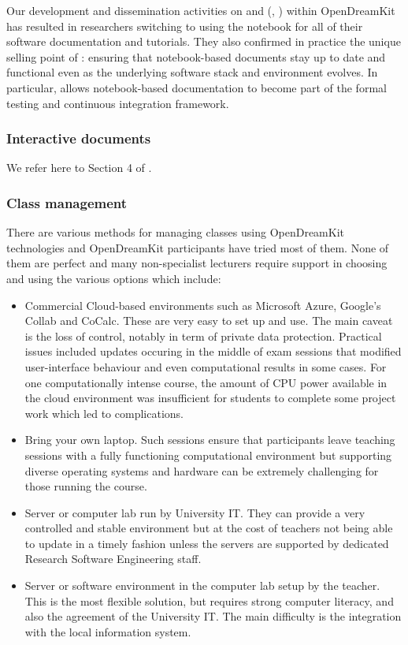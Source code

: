 \documentclass{deliverablereport}
\begin{document}
Our development and dissemination activities on \nbval and \nbdime
(, ) within
OpenDreamKit has resulted in researchers switching to using the
notebook for all of their software documentation and tutorials. They
also confirmed in practice the unique selling point of \nbval:
ensuring that notebook-based documents stay up to date and functional
even as the underlying software stack and environment evolves. In
particular, \nbval allows notebook-based documentation to become part
of the formal testing and continuous integration framework.

\subsubsection{Interactive documents}

We refer here to Section 4 of .

\subsubsection{Class management}

There are various methods for managing classes using OpenDreamKit
technologies and OpenDreamKit participants have tried most of them. None
of them are perfect and many non-specialist lecturers require support in
choosing and using the various options which include:

\begin{itemize}
\tightlist
\item Commercial Cloud-based environments such as Microsoft Azure,
  Google's Collab and CoCalc. These are very easy to set up and use.
  The main caveat is the loss of control, notably in term of private
  data protection. Practical issues included updates occuring in the middle of exam
  sessions that modified user-interface behaviour and even computational
  results in some cases. For one computationally intense course, the
  amount of CPU power available in the cloud environment was
  insufficient for students to complete some project work which led to
  complications.
\item
  Bring your own laptop. Such sessions ensure that participants leave
  teaching sessions with a fully functioning computational environment
  but supporting diverse operating systems and hardware can be extremely
  challenging for those running the course.
\item Server or computer lab run by University IT. They can provide a
  very controlled and stable environment but at the cost of teachers
  not being able to update in a timely fashion unless the servers are
  supported by dedicated Research Software Engineering staff.
\item Server or software environment in the computer lab setup by the
  teacher. This is the most flexible solution, but requires strong
  computer literacy, and also the agreement of the University IT. The main
  difficulty is the integration with the local information system.
\end{itemize}
\end{document}

